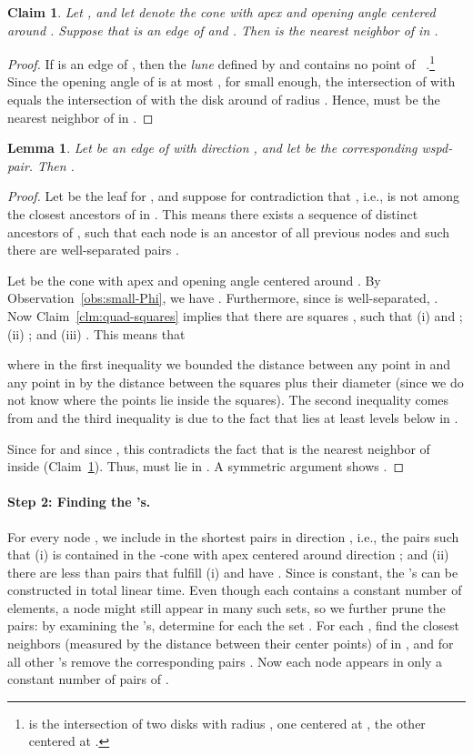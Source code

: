 \documentclass[11pt]{paper}
\newtheorem {lem}[theorem] {Lemma}
\newtheorem {claim}[theorem] {Claim}
\begin{document}
\begin{claim}\label{clm:lune_nn}
Let , and let  denote the cone with
apex  and opening angle  centered around .
Suppose that  is an edge of  and
.  Then  is the nearest neighbor of 
in .
\end{claim}

\begin{proof}
If  is an edge of , then the \emph{lune}  defined by
 and  contains no point of ~\cite{deBergChvKrOv08}.\footnote{
is the intersection
of two disks with radius , one centered at , the other centered
at .}
Since the opening angle of  is at most  ,
for  small enough,
the intersection of  with  equals
the intersection of  with the disk around 
 of radius . Hence,  must be the nearest neighbor of
 in .
\end{proof}


\begin{lem}\label{lem:constant-levels}
Let  be an edge of  with direction , and let
 be the corresponding wspd-pair.
Then .
\end{lem}

\begin{proof}
Let  be the leaf for , and suppose for contradiction
that , i.e.,  is not among the   closest
ancestors of  in .
This means there exists a
sequence
 of  distinct ancestors of ,
such that each node is an ancestor of all previous nodes and such
there are well-separated
pairs .


Let  be the cone with apex  and opening angle
 centered around .  By Observation~\ref{obs:small-Phi},
we have .
Furthermore, since  is well-separated, 
.
Now Claim~\ref{clm:quad-squares} implies that there are
squares ,  such that
(i) 
and  ;
(ii) ; and
(iii) .
This means that 

where in the first inequality we bounded the distance between
any point in  and any point in  by the distance between the
squares plus their diameter (since we do not know where
the points lie inside the squares). The second inequality
comes from  and 
the third inequality is due to the fact that  lies
at least  levels below  in .

Since  for  and  since
,
this contradicts the fact that  is the nearest neighbor
of  inside  (Claim~\ref{clm:lune_nn}). 
Thus,  must lie in .
A symmetric argument shows .
\end{proof}

\paragraph{Step 2: Finding the 's.}
For every node , we include in  the  shortest
pairs in direction , i.e., the
pairs  such that
(i)  is contained
in the -cone  with apex 
centered around direction ;
and (ii) there are less than  pairs 
that fulfill (i) and have
.
Since  is constant,
the 's can be constructed in total linear
time.
Even though each  contains a constant number of
elements, a node might still appear in many such sets, so
we further prune the pairs:
by examining the 's, determine for each  the
set .
For each , find the  closest neighbors
(measured by the distance between their center points) of  in
, and for all other 's remove the
corresponding pairs .
Now each node appears in only a constant number of pairs of
.
\end{document}
